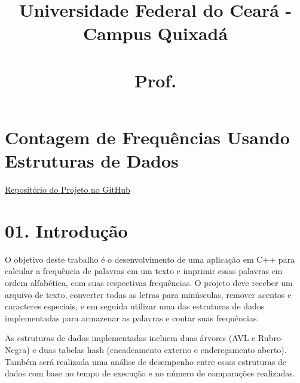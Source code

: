 \documentclass{article}
\title{Universidade Federal do Ceará - Campus Quixadá \\ \disciplina \\ Prof. \professor}
\author{\autor}
\date{\data}
\newcommand{\trabalhoTitulo}{\textbf{Contagem de Frequências Usando Estruturas de Dados}}
\begin{document}
\maketitle

\section*{\trabalhoTitulo}
\href{https://github.com/auanK/Dictionary}{\underline{Repositório do Projeto no GitHub}}

\section*{01. Introdução}

O objetivo deste trabalho é o desenvolvimento de uma aplicação em C++ para calcular a frequência de palavras em um texto e imprimir essas palavras em ordem alfabética, com suas respectivas frequências. O projeto deve receber um arquivo de texto, converter todas as letras para minúsculas, remover acentos e caracteres especiais, e em seguida utilizar uma das estruturas de dados implementadas para armazenar as palavras e contar suas frequências.

As estruturas de dados implementadas incluem duas árvores (AVL e Rubro-Negra) e duas tabelas hash (encadeamento externo e endereçamento aberto). Também será realizada uma análise de desempenho entre essas estruturas de dados com base no tempo de execução e no número de comparações realizadas.
\end{document}

